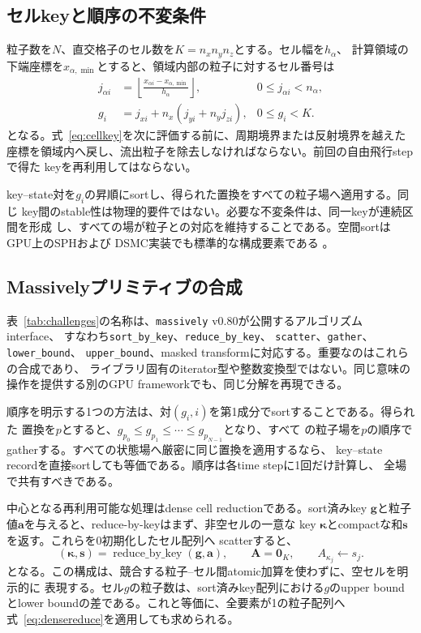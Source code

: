\documentclass[a4paper,11pt]{ltjsarticle}
\newcommand{\massively}{\texttt{massively}\xspace}
\newcommand{\vect}[1]{\bm{#1}}
\begin{document}
\subsection{セルkeyと順序の不変条件}

粒子数を$N$、直交格子のセル数を$K=n_xn_yn_z$とする。セル幅を$h_\alpha$、
計算領域の下端座標を$x_{\alpha,\min}$とすると、領域内部の粒子に対するセル番号は
\begin{align}
 j_{\alpha i}&=\left\lfloor
 \frac{x_{\alpha i}-x_{\alpha,\min}}{h_\alpha}\right\rfloor,
 & 0\leq j_{\alpha i}<n_\alpha,\\
 g_i&=j_{xi}+n_x\left(j_{yi}+n_yj_{zi}\right),
 &0\leq g_i<K.
 \label{eq:cellkey}
\end{align}
となる。式~\eqref{eq:cellkey}を次に評価する前に、周期境界または反射境界を越えた
座標を領域内へ戻し、流出粒子を除去しなければならない。前回の自由飛行stepで得た
keyを再利用してはならない。

key--state対を$g_i$の昇順にsortし、得られた置換をすべての粒子場へ適用する。同じ
key間のstable性は物理的要件ではない。必要な不変条件は、同一keyが連続区間を形成
し、すべての場が粒子との対応を維持することである。空間sortはGPU上のSPHおよび
DSMC実装でも標準的な構成要素である \cite{crespo2011,su2012}。

\subsection{Massivelyプリミティブの合成}

表~\ref{tab:challenges}の名称は、\massively v0.80が公開するアルゴリズムinterface、
すなわち\texttt{sort\_by\_key}、\texttt{reduce\_by\_key}、
\texttt{scatter}、\texttt{gather}、\texttt{lower\_bound}、
\texttt{upper\_bound}、masked transformに対応する。重要なのはこれらの合成であり、
ライブラリ固有のiterator型や整数変換型ではない。同じ意味の操作を提供する別のGPU
frameworkでも、同じ分解を再現できる。

順序を明示する1つの方法は、対$(g_i,i)$を第1成分でsortすることである。得られた
置換を$p$とすると、$g_{p_0}\leq g_{p_1}\leq\cdots\leq g_{p_{N-1}}$となり、すべて
の粒子場を$p$の順序でgatherする。すべての状態場へ厳密に同じ置換を適用するなら、
key--state recordを直接sortしても等価である。順序は各time stepに1回だけ計算し、
全場で共有すべきである。

中心となる再利用可能な処理はdense cell reductionである。sort済みkey
$\vect{g}$と粒子値$\vect{a}$を与えると、reduce-by-keyはまず、非空セルの一意な
key $\vect{\kappa}$とcompactな和$\vect{s}$を返す。これらを0初期化したセル配列へ
scatterすると、
\begin{equation}
 (\vect{\kappa},\vect{s})=\operatorname{reduce\_by\_key}
 (\vect{g},\vect{a}),\qquad
 \vect{A}=\vect{0}_K,\qquad
 A_{\kappa_j}\leftarrow s_j.
 \label{eq:densereduce}
\end{equation}
となる。この構成は、競合する粒子--セル間atomic加算を使わずに、空セルを明示的に
表現する。セル$g$の粒子数は、sort済みkey配列における$g$のupper boundとlower
boundの差である。これと等価に、全要素が1の粒子配列へ
式~\eqref{eq:densereduce}を適用しても求められる。
\end{document}
